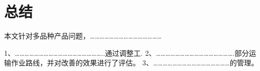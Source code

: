 \chapter{总结}
本文针对多品种产品问题，………………………………………

1、………………………………………………..通过调整工.
2、………………………………………….部分运输作业路线，并对改善的效果进行了评估。
3、…………………………………………的管理。
